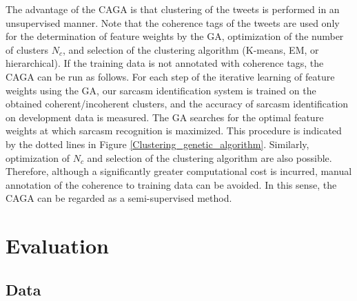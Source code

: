 \documentclass[english]{jnlp_1.4}
\begin{document}
The advantage of the CAGA is that clustering of the tweets is performed in an unsupervised manner.
Note that the coherence tags of the tweets are used only for the determination of feature weights by the GA, optimization of the number of clusters $N_c$, and selection of the clustering algorithm (K-means, EM, or hierarchical).
If the training data is not annotated with coherence tags, the CAGA can be run as follows.
For each step of the iterative learning of feature weights using the GA, our sarcasm identification system is trained on the obtained coherent/incoherent clusters, and the accuracy of sarcasm identification on development data is measured.
The GA searches for the optimal feature weights at which sarcasm recognition is maximized.
This procedure is indicated by the dotted lines in Figure \ref{Clustering_genetic_algorithm}.
Similarly, optimization of $N_c$ and selection of the clustering algorithm are also possible.
Therefore, although a significantly greater computational cost is incurred, manual annotation of the coherence to training data can be avoided.
In this sense, the CAGA can be regarded as a semi-supervised method.


\section{Evaluation}
\label{sec:evaluation}


\subsection{Data}
\label{sec:data}
\end{document}
